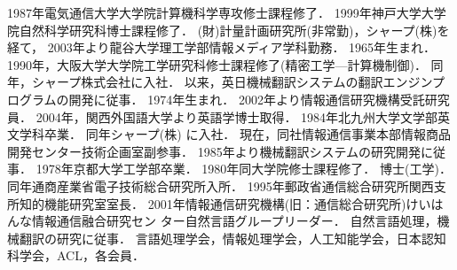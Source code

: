\begin{biography}
{1987年電気通信大学大学院計算機科学専攻修士課程修了．
1999年神戸大学大学院自然科学研究科博士課程修了．
(財)計量計画研究所(非常勤)，シャープ(株)を経て，
2003年より龍谷大学理工学部情報メディア学科勤務．
}
{1965年生まれ．
1990年，大阪大学大学院工学研究科修士課程修了(精密工学—計算機制御)．
同年，シャープ株式会社に入社．
以来，英日機械翻訳システムの翻訳エンジンプログラムの開発に従事．}
{1974年生まれ．
2002年より情報通信研究機構受託研究員．
2004年，関西外国語大学より英語学博士取得．}
{1984年北九州大学文学部英文学科卒業．
同年シャープ(株) に入社．
現在，同社情報通信事業本部情報商品開発センター技術企画室副参事．
1985年より機械翻訳システムの研究開発に従事．}
{1978年京都大学工学部卒業．
1980年同大学院修士課程修了．
博士(工学)．
同年通商産業省電子技術総合研究所入所．
1995年郵政省通信総合研究所関西支所知的機能研究室室長．
2001年情報通信研究機構(旧：通信総合研究所)けいはんな情報通信融合研究セン
ター自然言語グループリーダー．
自然言語処理，機械翻訳の研究に従事．
言語処理学会，情報処理学会，人工知能学会，日本認知科学会，ACL，各会員．}

\end{biography}


